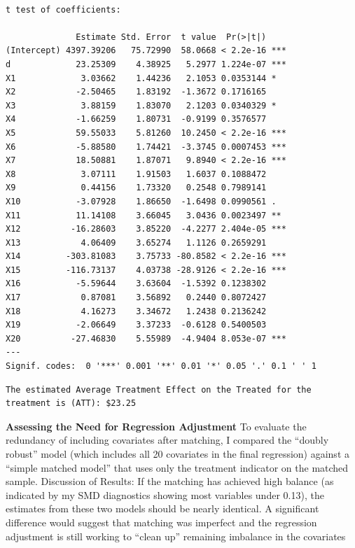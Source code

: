 \documentclass[
  letterpaper,
  DIV=11,
  numbers=noendperiod]{scrartcl}
\begin{document}
\begin{verbatim}

t test of coefficients:

              Estimate Std. Error  t value  Pr(>|t|)    
(Intercept) 4397.39206   75.72990  58.0668 < 2.2e-16 ***
d             23.25309    4.38925   5.2977 1.224e-07 ***
X1             3.03662    1.44236   2.1053 0.0353144 *  
X2            -2.50465    1.83192  -1.3672 0.1716165    
X3             3.88159    1.83070   2.1203 0.0340329 *  
X4            -1.66259    1.80731  -0.9199 0.3576577    
X5            59.55033    5.81260  10.2450 < 2.2e-16 ***
X6            -5.88580    1.74421  -3.3745 0.0007453 ***
X7            18.50881    1.87071   9.8940 < 2.2e-16 ***
X8             3.07111    1.91503   1.6037 0.1088472    
X9             0.44156    1.73320   0.2548 0.7989141    
X10           -3.07928    1.86650  -1.6498 0.0990561 .  
X11           11.14108    3.66045   3.0436 0.0023497 ** 
X12          -16.28603    3.85220  -4.2277 2.404e-05 ***
X13            4.06409    3.65274   1.1126 0.2659291    
X14         -303.81083    3.75733 -80.8582 < 2.2e-16 ***
X15         -116.73137    4.03738 -28.9126 < 2.2e-16 ***
X16           -5.59644    3.63604  -1.5392 0.1238302    
X17            0.87081    3.56892   0.2440 0.8072427    
X18            4.16273    3.34672   1.2438 0.2136242    
X19           -2.06649    3.37233  -0.6128 0.5400503    
X20          -27.46830    5.55989  -4.9404 8.053e-07 ***
---
Signif. codes:  0 '***' 0.001 '**' 0.01 '*' 0.05 '.' 0.1 ' ' 1
\end{verbatim}

\begin{verbatim}
The estimated Average Treatment Effect on the Treated for the treatment is (ATT): $23.25
\end{verbatim}

\textbf{Assessing the Need for Regression Adjustment} To evaluate the
redundancy of including covariates after matching, I compared the
``doubly robust'' model (which includes all 20 covariates in the final
regression) against a ``simple matched model'' that uses only the
treatment indicator on the matched sample. Discussion of Results: If the
matching has achieved high balance (as indicated by my SMD diagnostics
showing most variables under 0.13), the estimates from these two models
should be nearly identical. A significant difference would suggest that
matching was imperfect and the regression adjustment is still working to
``clean up'' remaining imbalance in the covariates
\end{document}
